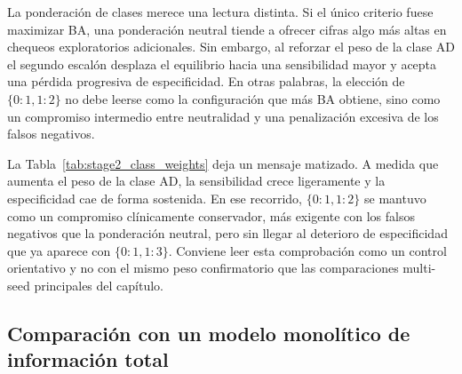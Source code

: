 La ponderación de clases merece una lectura distinta. Si el único criterio fuese maximizar BA, una ponderación neutral
tiende a ofrecer cifras algo más altas en chequeos exploratorios adicionales. Sin embargo, al reforzar el peso de la
clase AD el segundo escalón desplaza el equilibrio hacia una sensibilidad mayor y acepta una pérdida progresiva de
especificidad. En otras palabras, la elección de $\{0:1,1:2\}$ no debe leerse como la configuración que más BA obtiene,
sino como un compromiso intermedio entre neutralidad y una penalización excesiva de los falsos negativos.

\begin{table}[ht]
\centering
\caption{Chequeo exploratorio de ponderaciones de clase en el Stage 2 con $C=10$, realizado sobre 15 particiones externas adicionales.}
\label{tab:stage2_class_weights}
\small
\setlength{\tabcolsep}{4pt}
\end{table}

La Tabla~\ref{tab:stage2_class_weights} deja un mensaje matizado. A medida que aumenta el peso de la clase AD, la
sensibilidad crece ligeramente y la especificidad cae de forma sostenida. En ese recorrido, $\{0:1,1:2\}$ se mantuvo
como un compromiso clínicamente conservador, más exigente con los falsos negativos que la ponderación neutral, pero sin
llegar al deterioro de especificidad que ya aparece con $\{0:1,1:3\}$. Conviene leer esta comprobación como un control
orientativo y no con el mismo peso confirmatorio que las comparaciones multi-seed principales del capítulo.

\subsection{Comparación con un modelo monolítico de información total}

